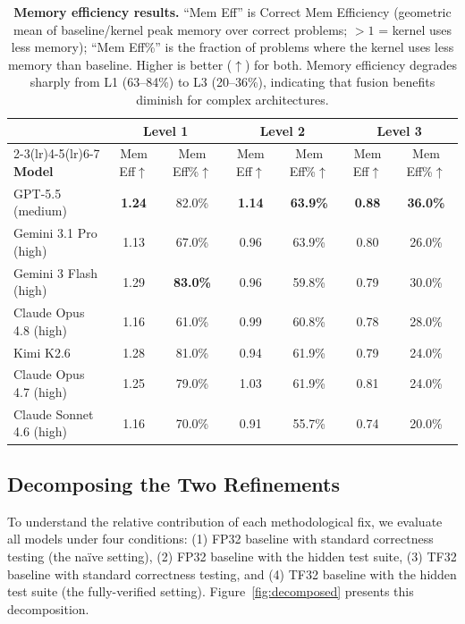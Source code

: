 \documentclass[]{fairmeta}
\newcommand{\best}[1]{\textbf{#1}}
\begin{document}
\begin{table}[H]
\centering
\caption{\textbf{Memory efficiency results.} ``Mem Eff'' is Correct Mem Efficiency (geometric mean of baseline/kernel peak memory over correct problems; $>1$ = kernel uses less memory); ``Mem Eff\%'' is the fraction of problems where the kernel uses less memory than baseline. Higher is better ($\uparrow$) for both. Memory efficiency degrades sharply from L1 (63--84\%) to L3 (20--36\%), indicating that fusion benefits diminish for complex architectures.}
\label{tab:memory}\small
\begin{tabular}{l cc cc cc}
\toprule
& \multicolumn{2}{c}{\textbf{Level 1}} & \multicolumn{2}{c}{\textbf{Level 2}} & \multicolumn{2}{c}{\textbf{Level 3}} \\
\cmidrule(lr){2-3}\cmidrule(lr){4-5}\cmidrule(lr){6-7}
\textbf{Model} & Mem Eff$\uparrow$ & Mem Eff\%$\uparrow$ & Mem Eff$\uparrow$ & Mem Eff\%$\uparrow$ & Mem Eff$\uparrow$ & Mem Eff\%$\uparrow$ \\
\midrule
GPT-5.5 (medium)           & \best{1.24} & 82.0\% & \best{1.14} & \best{63.9\%} & \best{0.88} & \best{36.0\%} \\
Gemini 3.1 Pro (high)      & 1.13 & 67.0\% & 0.96 & 63.9\% & 0.80 & 26.0\% \\
Gemini 3 Flash (high)      & 1.29 & \best{83.0\%} & 0.96 & 59.8\% & 0.79 & 30.0\% \\
Claude Opus 4.8 (high)     & 1.16 & 61.0\% & 0.99 & 60.8\% & 0.78 & 28.0\% \\
Kimi K2.6                  & 1.28 & 81.0\% & 0.94 & 61.9\% & 0.79 & 24.0\% \\
Claude Opus 4.7 (high)     & 1.25 & 79.0\% & 1.03 & 61.9\% & 0.81 & 24.0\% \\
Claude Sonnet 4.6 (high)   & 1.16 & 70.0\% & 0.91 & 55.7\% & 0.74 & 20.0\% \\
\bottomrule
\end{tabular}
\end{table}



\subsection{Decomposing the Two Refinements}
\label{sec:decomp}

To understand the relative contribution of each methodological fix, we evaluate all models under four conditions: (1) FP32 baseline with standard correctness testing (the na\"ive setting), (2) FP32 baseline with the hidden test suite, (3) TF32 baseline with standard correctness testing, and (4) TF32 baseline with the hidden test suite (the fully-verified setting). Figure~\ref{fig:decomposed} presents this decomposition.
\end{document}
